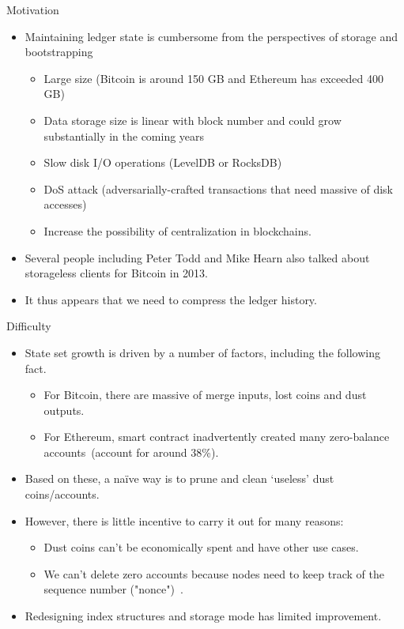 \documentclass[biblatex,aspectratio=169,11pt]{mybeamer}
\begin{document}
\begin{frame}{Motivation}
  \begin{itemize}
    \item Maintaining ledger state is cumbersome from the perspectives of \alert{storage} and \alert{bootstrapping}
    \begin{itemize}
       \item Large size (Bitcoin is around 150 GB and Ethereum has exceeded 400 GB)
       \item Data storage size is linear with block number and could grow substantially in the coming years
       \item Slow disk I/O operations (LevelDB or RocksDB)
       \item DoS attack (adversarially-crafted transactions that need massive of disk accesses)
       \item Increase the possibility of centralization in blockchains.
    \end{itemize}
    \item Several people including Peter Todd and Mike Hearn also talked about \alert{storageless clients} for Bitcoin in 2013.
    \item It thus appears that we need to compress the \alert{ledger history}.
  \end{itemize}
\end{frame}

\begin{frame}{Difficulty}
  \begin{itemize}
    \item State set growth is driven by a number of factors, including the following fact.
     \begin{itemize}
       \item For \alert{Bitcoin}, there are massive of merge inputs, lost coins and dust outputs.
       \item For \alert{Ethereum}, smart contract inadvertently created many \alert{zero-balance accounts}~(account for around 38\%).
     \end{itemize}
    \item Based on these, a na\"ive way is to prune and clean `useless' dust coins/accounts.
    \item However, there is little incentive to carry it out for many reasons:
     \begin{itemize}
       \item Dust coins can't be economically spent and have other use cases.
       \item We can't delete zero accounts because nodes need to keep track of the sequence number ("nonce")~\cite{wood2014ethereum}.
     \end{itemize}
    \item Redesigning index structures and storage mode has limited improvement.
  \end{itemize}
\end{frame}
\end{document}
